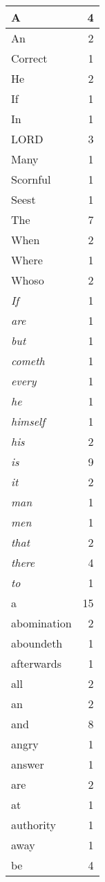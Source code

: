 \begin{center}
\begin{longtable}{l|r}
A & 4\\ \hline 
An & 2\\ \hline 
Correct & 1\\ \hline 
He & 2\\ \hline 
If & 1\\ \hline 
In & 1\\ \hline 
LORD & 3\\ \hline 
Many & 1\\ \hline 
Scornful & 1\\ \hline 
Seest & 1\\ \hline 
The & 7\\ \hline 
When & 2\\ \hline 
Where & 1\\ \hline 
Whoso & 2\\ \hline 
\emph{If} & 1\\ \hline 
\emph{are} & 1\\ \hline 
\emph{but} & 1\\ \hline 
\emph{cometh} & 1\\ \hline 
\emph{every} & 1\\ \hline 
\emph{he} & 1\\ \hline 
\emph{himself} & 1\\ \hline 
\emph{his} & 2\\ \hline 
\emph{is} & 9\\ \hline 
\emph{it} & 2\\ \hline 
\emph{man} & 1\\ \hline 
\emph{men} & 1\\ \hline 
\emph{that} & 2\\ \hline 
\emph{there} & 4\\ \hline 
\emph{to} & 1\\ \hline 
a & 15\\ \hline 
abomination & 2\\ \hline 
aboundeth & 1\\ \hline 
afterwards & 1\\ \hline 
all & 2\\ \hline 
an & 2\\ \hline 
and & 8\\ \hline 
angry & 1\\ \hline 
answer & 1\\ \hline 
are & 2\\ \hline 
at & 1\\ \hline 
authority & 1\\ \hline 
away & 1\\ \hline 
be & 4\\ \hline 

\end{longtable}
\end{center}
